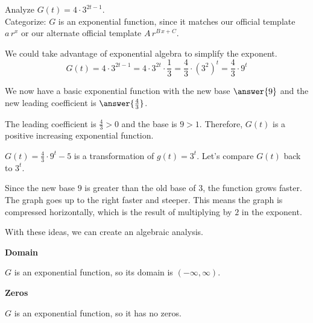\documentclass{ximera}
\begin{document}
\begin{example} 



Analyze $G(t) = 4 \cdot 3^{2t-1}$.   \\



Categorize:  $G$ is an exponential function, since it matches our official template $a \, r^x$ or our alternate official template $A \, r^{B \, x + C}$. \\


\begin{idea}


We could take advantage of exponential algebra to simplify the exponent.   \\

\[ 
G(t) = 4 \cdot 3^{2t-1} = 4 \cdot 3^{2t} \cdot \frac{1}{3} = \frac{4}{3} \cdot (3^2)^t  = \frac{4}{3} \cdot 9^t
\]


We now have a basic exponential function with the new base $\answer{9}$ and the new leading coefficient is $\answer{\frac{4}{3}}$.




The leading coefficient is $\frac{4}{3} > 0$ and the base is $9 > 1$. Therefore, $G(t)$ is a positive increasing exponential function.



$G(t) = \frac{4}{3} \cdot 9^t - 5$ is a transformation of $g(t) = 3^t$.  Let's compare $G(t)$ back to $3^t$.


Since the new base $9$ is greater than the old base of $3$, the function grows faster.  The graph goes up to the right faster and steeper.  This means the graph is compressed horizontally, which is the result of multiplying by $2$ in the exponent.


With these ideas, we can create an algebraic analysis. 



\end{idea}







\textbf{Domain}


$G$ is an exponential function, so its domain is $(-\infty, \infty)$.





\textbf{Zeros}


$G$ is an exponential function, so it has no zeros.





\end{example}
\end{document}
